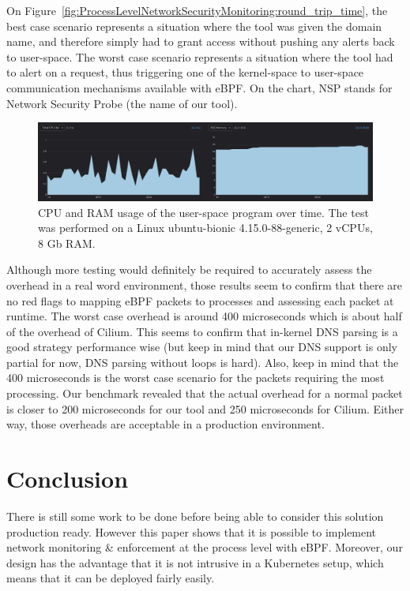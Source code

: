 On Figure~\ref{fig:ProcessLevelNetworkSecurityMonitoring:round_trip_time}, the best case scenario represents a situation where the tool was given the domain name, and therefore simply had to grant access without pushing any alerts back to user-space. The worst case scenario represents a situation where the tool had to alert on a request, thus triggering one of the kernel-space to user-space communication mechanisms available with eBPF. On the chart, NSP stands for Network Security Probe (the name of our tool).

\begin{figure}
  \centering
  \includegraphics[width=\textwidth]{ProcessLevelNetworkSecurityMonitoring/img/CPU-RAM.png}
  \caption{CPU and RAM usage of the user-space program over time. The test was performed on a Linux ubuntu-bionic 4.15.0-88-generic, 2 vCPUs, 8 Gb RAM.}
  \label{fig:ProcessLevelNetworkSecurityMonitoring:CPU_RAM}
\end{figure}

Although more testing would definitely be required to accurately assess the overhead in a real word environment, those results seem to confirm that there are no red flags to mapping eBPF packets to processes and assessing each packet at runtime. The worst case overhead is around 400 microseconds which is about half of the overhead of Cilium. This seems to confirm that in-kernel DNS parsing is a good strategy performance wise (but keep in mind that our DNS support is only partial for now, DNS parsing without loops is hard). Also, keep in mind that the 400 microseconds is the worst case scenario for the packets requiring the most processing. Our benchmark revealed that the actual overhead for a normal packet is closer to 200 microseconds for our tool and 250 microseconds for Cilium. Either way, those overheads are acceptable in a production environment.


\section{Conclusion}

There is still some work to be done before being able to consider this solution production ready. However this paper shows that it is possible to implement network monitoring \& enforcement at the process level with eBPF. Moreover, our design has the advantage that it is not intrusive in a Kubernetes setup, which means that it can be deployed fairly easily.

